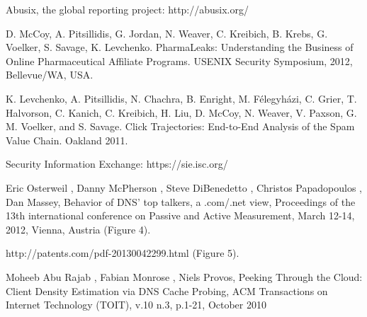 \documentclass[11pt,a4paper]{article}
\begin{document}
\begin{thebibliography}{1}
 Abusix, the global reporting project: http://abusix.org/

 D. McCoy, A. Pitsillidis, G. Jordan, N. Weaver, C. Kreibich, B. Krebs, G. Voelker, S. Savage, K. Levchenko. PharmaLeaks: Understanding the Business of Online Pharmaceutical Affiliate Programs. USENIX Security Symposium, 2012, Bellevue/WA, USA. 

 K. Levchenko, A. Pitsillidis, N. Chachra, B. Enright, M. Félegyházi, C. Grier, T. Halvorson, C. Kanich, C. Kreibich, H. Liu, D. McCoy, N. Weaver, V. Paxson, G. M. Voelker, and S. Savage. Click Trajectories: End-to-End Analysis of the Spam Value Chain. Oakland 2011.

 Security Information Exchange: https://sie.isc.org/

 Eric Osterweil , Danny McPherson , Steve DiBenedetto , Christos Papadopoulos , Dan Massey, Behavior of DNS' top talkers, a .com/.net view, Proceedings of the 13th international conference on Passive and Active Measurement, March 12-14, 2012, Vienna, Austria (Figure 4).

 http://patents.com/pdf-20130042299.html (Figure 5).

 Moheeb Abu Rajab , Fabian Monrose , Niels Provos, Peeking Through the Cloud: Client Density Estimation via DNS Cache Probing, ACM Transactions on Internet Technology (TOIT), v.10 n.3, p.1-21, October 2010


\end{thebibliography}
\end{document}
